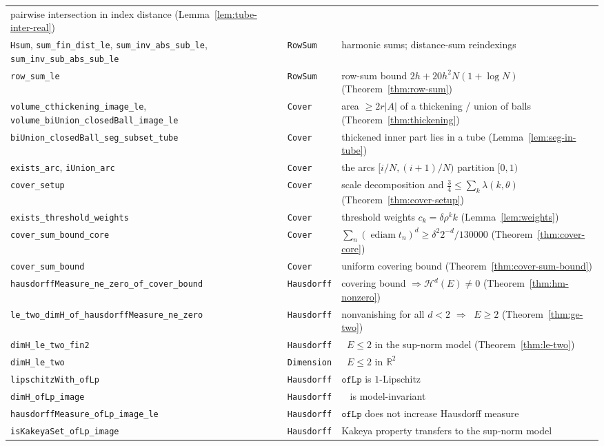 \documentclass[11pt,a4paper]{article}
\DeclareMathOperator{\ediam}{ediam}
\DeclareMathOperator{\Hdim}{dim_H}
\newcommand{\HM}[1]{\mathcal{H}^{#1}}                %
\newcommand{\Plane}{\ensuremath{\mathbb{R}^{2}}}     %
\newcommand{\lname}[1]{\texttt{#1}}                  %
\newcommand{\lb}{\_\allowbreak}                      %
\theoremstyle{definition}
\theoremstyle{remark}
\begin{document}
\begin{longtable}{@{}>{\raggedright\arraybackslash}p{}
                    >{\raggedright\arraybackslash}p{}
                    >{\raggedright\arraybackslash}p{}@{}}
  pairwise intersection in index distance (Lemma~\ref{lem:tube-inter-real}) \\
\lname{Hsum}, \lname{sum\lb fin\lb dist\lb le}, \lname{sum\lb inv\lb abs\lb sub\lb le},
  \lname{sum\lb inv\lb sub\lb abs\lb sub\lb le} & \lname{RowSum} &
  harmonic sums; distance-sum reindexings \\
\lname{row\lb sum\lb le} & \lname{RowSum} &
  row-sum bound $2h+20h^2N(1+\log N)$ (Theorem~\ref{thm:row-sum}) \\
\midrule
\lname{volume\lb cthickening\lb image\lb le},
  \lname{volume\lb biUnion\lb closedBall\lb image\lb le} & \lname{Cover} &
  area $\ge 2r|A|$ of a thickening / union of balls (Theorem~\ref{thm:thickening}) \\
\lname{biUnion\lb closedBall\lb seg\lb subset\lb tube} & \lname{Cover} &
  thickened inner part lies in a tube (Lemma~\ref{lem:seg-in-tube}) \\
\lname{exists\lb arc}, \lname{iUnion\lb arc} & \lname{Cover} &
  the arcs $[i/N,(i+1)/N)$ partition $[0,1)$ \\
\lname{cover\lb setup} & \lname{Cover} &
  scale decomposition and $\tfrac34\le\sum_k\lambda(k,\theta)$
  (Theorem~\ref{thm:cover-setup}) \\
\lname{exists\lb threshold\lb weights} & \lname{Cover} &
  threshold weights $c_k=\delta\rho^k k$ (Lemma~\ref{lem:weights}) \\
\lname{cover\lb sum\lb bound\lb core} & \lname{Cover} &
  $\sum_n(\ediam t_n)^d\ge \delta^2 2^{-d}/130000$
  (Theorem~\ref{thm:cover-core}) \\
\lname{cover\lb sum\lb bound} & \lname{Cover} &
  uniform covering bound (Theorem~\ref{thm:cover-sum-bound}) \\
\midrule
\lname{hausdorffMeasure\lb ne\lb zero\lb of\lb cover\lb bound} & \lname{Hausdorff} &
  covering bound $\Rightarrow \HM d(E)\ne0$
  (Theorem~\ref{thm:hm-nonzero}) \\
\lname{le\lb two\lb dimH\lb of\lb hausdorffMeasure\lb ne\lb zero} & \lname{Hausdorff} &
  nonvanishing for all $d<2$ $\Rightarrow \Hdim E\ge2$ (Theorem~\ref{thm:ge-two}) \\
\lname{dimH\lb le\lb two\lb fin2} & \lname{Hausdorff} &
  $\Hdim E\le 2$ in the sup-norm model (Theorem~\ref{thm:le-two}) \\
\lname{dimH\lb le\lb two} & \lname{Dimension} & $\Hdim E\le2$ in $\Plane$ \\
\lname{lipschitzWith\lb ofLp} & \lname{Hausdorff} &
  $\lname{ofLp}$ is $1$-Lipschitz \\
\lname{dimH\lb ofLp\lb image} & \lname{Hausdorff} &
  $\Hdim$ is model-invariant \\
\lname{hausdorffMeasure\lb ofLp\lb image\lb le} & \lname{Hausdorff} &
  $\lname{ofLp}$ does not increase Hausdorff measure \\
\lname{isKakeyaSet\lb ofLp\lb image} & \lname{Hausdorff} &
  Kakeya property transfers to the sup-norm model \\
\end{longtable}
\endgroup
\end{document}

